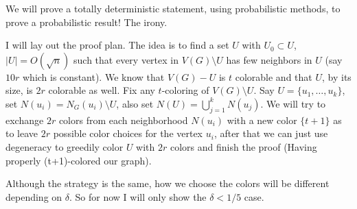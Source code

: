 \begin{remark}
	We will prove a totally deterministic statement, using probabilistic
	methods, to prove a probabilistic result! The irony.
\end{remark}

I will lay out the proof plan. The idea is to find a set $U$ with
$U_0 \subset U$, $|U| =
O(\sqrt{n})$ such that every vertex in $V(G) \setminus U$ has few
neighbors in $U$ (say $10r$ which is constant).
We know that $V(G) - U$ is $t$ colorable and that $U$, by its size,
is $2r$ colorable as well. Fix any $t$-coloring of $V(G) \setminus
U$. Say $U = \{u_1, \dots, u_k\}$, set
$N(u_i) = N_G(u_i) \setminus U$, also set $N(U) = \bigcup_{j = 1}^k N(u_j)$.
We will try to exchange $2r$ colors from each neighborhood $N(u_i)$
with a new color $\{t+1\}$ as to leave $2r$ possible
color choices for the vertex $u_i$, after that we can just use
degeneracy to greedily color $U$ with $2r$ colors and finish the proof (Having
properly (t+1)-colored our graph).

Although the strategy is the same, how we choose the colors will be
different depending on $\delta$.
So for now I will only show the $\delta < 1/5$ case.


